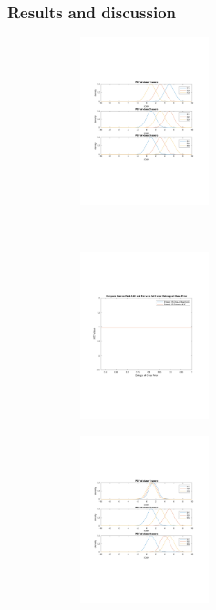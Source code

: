 \documentclass[twoside,11pt]{article}
\renewcommand{\>}{{\rightarrow}}
\newcommand{\1}{{\mathbf 1}}
\newcommand{\0}{{\mathbf 0}}
\begin{document}
\subsubsection{Results and discussion}

\begin{figure}[t!]
    \centering
    \begin{subfigure}[b]{0.5\textwidth}
        \centering
        \includegraphics[height=1.9in]{pic/vis_pdf_score_B.pdf}
        \caption{}
    \end{subfigure}%
    ~ 
    \begin{subfigure}[b]{0.5\textwidth}
        \centering
        \includegraphics[height=1.9in]{pic/vis_ent_auc_B.pdf}
        \caption{}
    \end{subfigure}
    \caption{One-VS-Rest AUC and Pairwise AUC plotted over the entropy of the probability distribution of the class, with the same separability setting among classes (Situation A).}
    \begin{subfigure}[b]{0.5\textwidth}
        \centering
        \includegraphics[height=1.9in]{pic/vis_pdf_score_A.pdf}

\end{subfigure}
\end{figure}
\end{document}
